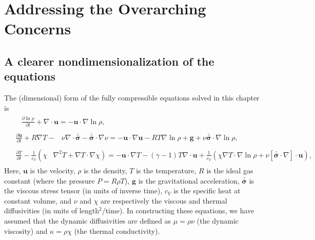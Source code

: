 \documentclass[aps, pre, onecolumn, nofootinbib, notitlepage, groupedaddress, amsfonts, amssymb, amsmath, longbibliography, superscriptaddress]{revtex4-1}
\newcommand{\grad}{\ensuremath{\nabla}}
\newcommand{\lilstressT}{\ensuremath{\bm{\bar{\bar{\sigma}}}}}
\begin{document}
\section{Addressing the Overarching Concerns}

\subsection{A clearer nondimensionalization of the equations}
\label{sec:introduction}
The (dimensional) form of the fully compressible equations solved in this chapter is
\begin{align}
&\begin{aligned}
&\frac{\partial \ln\rho}{\partial t} + \grad\cdot\bm{u} 
    = -\bm{u}\cdot\grad\ln\rho,
	\label{eqn:ab17continuity_eqn}
\end{aligned}\\
&\begin{aligned}
\frac{\partial\bm{u}}{\partial t} + R \grad T - 
&\nu\grad\cdot\lilstressT - \lilstressT\cdot\grad\nu =
-\bm{u}\cdot\grad\bm{u} - RT\grad\ln\rho + \bm{g} + 
\nu\lilstressT\cdot\grad\ln\rho,
\label{eqn:ab17momentum_eqn}
\end{aligned}\\
&\begin{aligned}
\frac{\partial T}{\partial t} -\frac{1}{c_V}\left(\right.\chi&\left.
    \grad^2 T + \grad T\cdot\grad\chi\right) =
	-\bm{u}\cdot\grad T - (\gamma-1)T\grad\cdot{\bm{u}}
	+ \frac{1}{c_V}\left(\chi\grad T \cdot\grad\ln\rho +
	\nu\left[\lilstressT\cdot\nabla\right]\cdot\bm{u}\right), 
	\label{eqn:ab17energy_eqn}
\end{aligned}
\end{align}
Here, $\bm{u}$ is the velocity, $\rho$ is the density, $T$ is the temperature, $R$ is the ideal gas constant (where the pressure $P = R\rho T$), $\bm{g}$ is the gravitational acceleration, $\lilstressT$ is the viscous stress tensor (in units of inverse time), $c_V$ is the specific heat at constant volume, and $\nu$ and $\chi$ are respectively the viscous and thermal diffusivities (in units of length$^2$/time).
In constructing these equations, we have assumed that the dynamic diffusivities are defined as $\mu = \rho \nu$ (the dynamic viscosity) and $\kappa = \rho \chi$ (the thermal conductivity).
\end{document}
